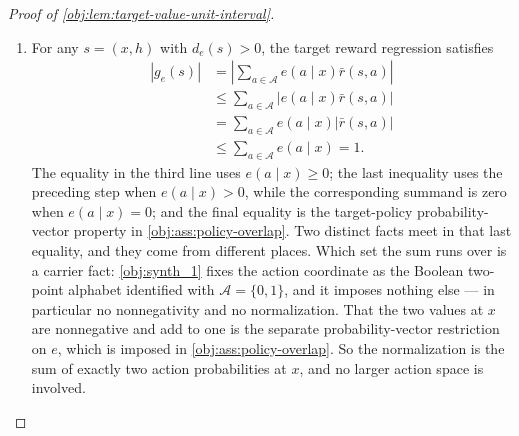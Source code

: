 \begin{proof}[Proof of \cref{obj:lem:target-value-unit-interval}]
\begin{enumerate}
The action-coordinate argument uses the local hypothesis \(e(a\mid x)>0\), the nonnegativity of the behavior carrier, and the policy-overlap inequality. The inequality comes from \cref{obj:ass:policy-overlap}, which for the policy-overlap constant \(L\) gives
\[
e(a\mid x)\le L\,b(a\mid x);
\]
the nonnegativity \(b(a\mid x)\ge0\) comes from \cref{obj:ass:sequential-ignorability}, which is where \(b\) is declared a probability vector. If \(b(a\mid x)\) were not positive, that nonnegativity would force \(b(a\mid x)=0\), whence \(0<e(a\mid x)\le L\cdot0=0\), a contradiction. Thus \(b(a\mid x)>0\). The row bound from the previous step applies, and hence
\[
|\bar r(s,a)|\le1
\qquad
\text{whenever } d_e(s)>0 \text{ and } e(a\mid x)>0.
\]

\item For any \(s=(x,h)\) with \(d_e(s)>0\), the target reward regression satisfies
\[
\begin{aligned}
|g_e(s)|
&=
\left|\sum_{a\in\mathcal A} e(a\mid x)\bar r(s,a)\right|  \\
&\le
\sum_{a\in\mathcal A} \left|e(a\mid x)\bar r(s,a)\right| \\
&=
\sum_{a\in\mathcal A} e(a\mid x)|\bar r(s,a)| \\
&\le
\sum_{a\in\mathcal A} e(a\mid x)
=1.
\end{aligned}
\]
The equality in the third line uses \(e(a\mid x)\ge0\); the last inequality uses the preceding step when \(e(a\mid x)>0\), while the corresponding summand is zero when \(e(a\mid x)=0\); and the final equality is the target-policy probability-vector property in \cref{obj:ass:policy-overlap}. Two distinct facts meet in that last equality, and they come from different places. Which set the sum runs over is a carrier fact: \cref{obj:synth_1} fixes the action coordinate as the Boolean two-point alphabet identified with \(\mathcal A=\{0,1\}\), and it imposes nothing else --- in particular no nonnegativity and no normalization. That the two values at \(x\) are nonnegative and add to one is the separate probability-vector restriction on \(e\), which is imposed in \cref{obj:ass:policy-overlap}. So the normalization is the sum of exactly two action probabilities at \(x\), and no larger action space is involved.


\end{enumerate}
\end{proof}
